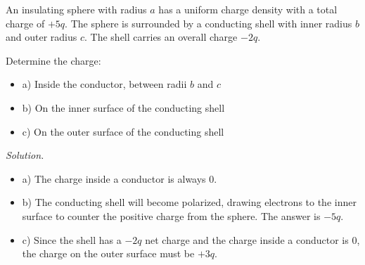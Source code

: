 \documentclass[12pt, titlepage]{article}
\begin{document}
\begin{Problem}
    An insulating sphere with radius $a$ has a uniform charge density with a total charge of $+5q$. The sphere is surrounded by a conducting shell with inner radius $b$ and outer radius $c$. The shell carries an overall charge $-2q$.

    Determine the charge:
    \begin{itemize}
        \item[] a) Inside the conductor, between radii $b$ and $c$
        \item[] b) On the inner surface of the conducting shell
        \item[] c) On the outer surface of the conducting shell
    \end{itemize}

    \tcblower

    \textit{Solution. }
    \begin{itemize}
        \item[] a) The charge inside a conductor is always 0.
        \item[] b) The conducting shell will become polarized, drawing electrons to the inner surface to counter the positive charge from the sphere. The answer is $-5q$.
        \item[] c) Since the shell has a $-2q$ net charge and the charge inside a conductor is 0, the charge on the outer surface must be $+3q$.
    \end{itemize}
\end{Problem}
\end{document}
